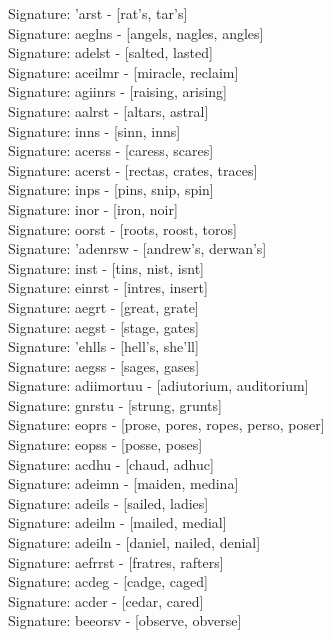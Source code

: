 Signature: {'arst} - [rat's, tar's] \\
Signature: {aeglns} - [angels, nagles, angles] \\
Signature: {adelst} - [salted, lasted] \\
Signature: {aceilmr} - [miracle, reclaim] \\
Signature: {agiinrs} - [raising, arising] \\
Signature: {aalrst} - [altars, astral] \\
Signature: {inns} - [sinn, inns] \\
Signature: {acerss} - [caress, scares] \\
Signature: {acerst} - [rectas, crates, traces] \\
Signature: {inps} - [pins, snip, spin] \\
Signature: {inor} - [iron, noir] \\
Signature: {oorst} - [roots, roost, toros] \\
Signature: {'adenrsw} - [andrew's, derwan's] \\
Signature: {inst} - [tins, nist, isnt] \\
Signature: {einrst} - [intres, insert] \\
Signature: {aegrt} - [great, grate] \\
Signature: {aegst} - [stage, gates] \\
Signature: {'ehlls} - [hell's, she'll] \\
Signature: {aegss} - [sages, gases] \\
Signature: {adiimortuu} - [adiutorium, auditorium] \\
Signature: {gnrstu} - [strung, grunts] \\
Signature: {eoprs} - [prose, pores, ropes, perso, poser] \\
Signature: {eopss} - [posse, poses] \\
Signature: {acdhu} - [chaud, adhuc] \\
Signature: {adeimn} - [maiden, medina] \\
Signature: {adeils} - [sailed, ladies] \\
Signature: {adeilm} - [mailed, medial] \\
Signature: {adeiln} - [daniel, nailed, denial] \\
Signature: {aefrrst} - [fratres, rafters] \\
Signature: {acdeg} - [cadge, caged] \\
Signature: {acder} - [cedar, cared] \\
Signature: {beeorsv} - [observe, obverse] \\
